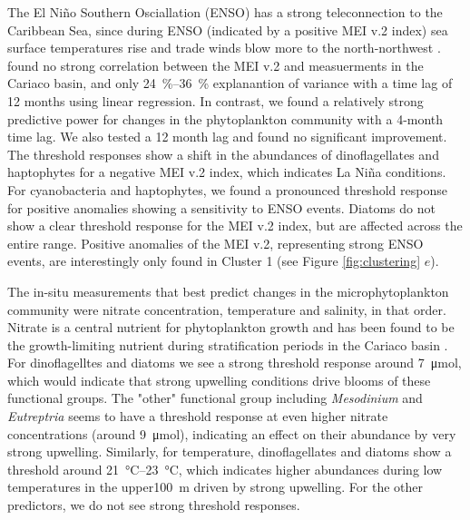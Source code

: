\documentclass[draft]{agujournal2019}
\begin{document}
The El Niño Southern Osciallation (ENSO) has a strong teleconnection to the Caribbean Sea, since during ENSO (indicated by a positive MEI v.2 index) sea surface temperatures rise and trade winds blow more to the north-northwest \cite{enfield_tropical_1997}.  found no strong correlation between the MEI v.2 and measuerments in the Cariaco basin, and only \qtyrange{24}{36}{\%} explanantion of variance with a time lag of 12 months using linear regression. In contrast, we found a relatively strong predictive power for changes in the phytoplankton community with a 4-month time lag. We also tested a 12 month lag and found no significant improvement.
The threshold responses show a shift in the abundances of dinoflagellates and haptophytes for a negative MEI v.2 index, which indicates La Niña conditions. For cyanobacteria and haptophytes, we found a pronounced threshold response for positive anomalies showing a sensitivity to ENSO events. Diatoms do not show a clear threshold response for the MEI v.2 index, but are affected across the entire range. Positive anomalies of the MEI v.2, representing strong ENSO events, are interestingly only found in Cluster 1 (see Figure \ref{fig:clustering} $e$). 

The in-situ measurements that best predict changes in the microphytoplankton community were nitrate concentration, temperature and salinity, in that order. Nitrate is a central nutrient for phytoplankton growth and has been found to be the growth-limiting nutrient during stratification periods in the Cariaco basin \cite{muller-karger_scientific_2019}. For dinoflagelltes and diatoms we see a strong threshold response around \qty{7}{\micro \mole}, which would indicate that strong upwelling conditions drive blooms of these functional groups. The "other" functional group including \textit{Mesodinium} and \textit{Eutreptria} seems to have a threshold response at even higher nitrate concentrations (around \qty{9}{\micro \mole}), indicating an effect on their abundance by very strong upwelling. Similarly, for temperature, dinoflagellates and diatoms show a threshold around \qtyrange{21}{23}{\celsius}, which indicates higher abundances during low temperatures in the upper\qty{100}{m} driven by strong upwelling. For the other predictors, we do not see strong threshold responses.
\end{document}
